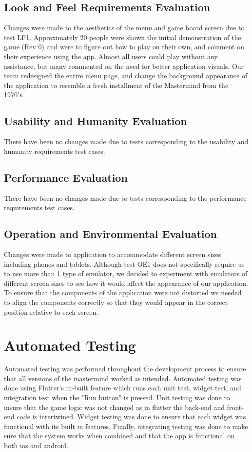 \documentclass[12pt, titlepage]{article}
\begin{document}
\subsection{Look and Feel Requirements Evaluation}

Changes were made to the aesthetics of the menu and game board screen due to test LF1. Approximately 20 people were shown the initial demonstration of the game (Rev 0) and were to figure out how to play on their own, and comment on their experience using the app. Almost all users could play without any assistance, but many commented on the need for better application visuals. Our team redesigned the entire menu page, and change the background appearance of the application to resemble a fresh installment of the Mastermind from the 1970's.

\subsection{Usability and Humanity Evaluation}

There have been no changes made due to tests corresponding to the usability and humanity requirements test cases.

\subsection{Performance Evaluation}

There have been no changes made due to tests corresponding to the performance requirements test cases.

\subsection{Operation and Environmental Evaluation}

Changes were made to application to accommodate different screen sizes including phones and tablets. Although test OE1 does not specifically require us to use more than 1 type of emulator, we decided to experiment with emulators of different screen sizes to see how it would affect the appearance of our application. To ensure that the components of the application were not distorted we needed to align the components correctly so that they would appear in the correct position relative to each screen.


\section{Automated Testing}
Automated testing was performed throughout the development process to ensure that all versions of the mastermind worked as intended. Automated testing was done using Flutter's in-built feature which runs each unit test, widget test, and integration test when the "Run button" is pressed. Unit testing was done to insure that the game logic was not changed as in flutter the back-end and front-end code is intertwined. Widget testing was done to ensure that each widget was functional with its built in features. Finally, integrating testing was done to make sure that the system works when combined and that the app is functional on both ios and android.
		
\end{document}
